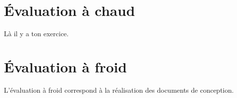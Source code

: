 \documentclass[asi, sansVersion]{picInsa}
\begin{document}
	\newpage
	\section*{Évaluation à chaud}
		Là il y a ton exercice.
			\vspace{8px}
			
			
	\newpage
	\section*{Évaluation à froid}
		L'évaluation à froid correspond à la réalisation des documents de conception.
\end{document}
